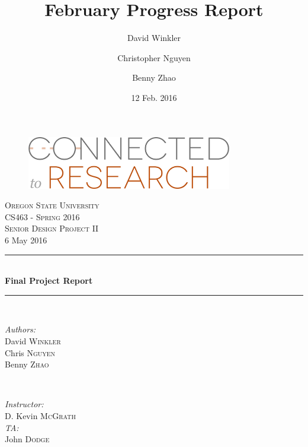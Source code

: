 \documentclass[onecolumn]{IEEEtran}
\title{February Progress Report}
\author{David Winkler \and Christopher Nguyen \and Benny Zhao}
\date{12 Feb. 2016}
\begin{document}
\begin{titlepage}
	\newcommand{\HRule}{\rule{\linewidth}{0.5mm}} %
	\center %
    
    \begin{figure}
        \centering
        \includegraphics[width=0.8\textwidth]{ctr_logo.png}
    \end{figure}
 
	\textsc{\LARGE Oregon State University}\\[1.5cm] %
	\textsc{\Large CS463 - Spring 2016}\\[0.5cm] %
	\textsc{\large Senior Design Project II}\\[0.5cm] %

	{\large 6 May 2016}\\[1cm]
    
	\HRule \\[0.4cm]
		{ \huge \bfseries Final Project Report}\\[0.4cm] %
	\HRule \\[1.5cm]

	\begin{minipage}{0.4\textwidth}
		\begin{flushleft} \large
			\emph{Authors:}\\
			David \textsc{Winkler}\\ %
			Chris \textsc{Nguyen}\\
			Benny \textsc{Zhao}
		\end{flushleft}
	\end{minipage}
	~
	\begin{minipage}{0.4\textwidth}
		\begin{flushright} \large
			\emph{Instructor:} \\
			D. Kevin \textsc{McGrath} \\
            \emph{TA:} \\
            John \textsc{Dodge}
		\end{flushright}
	\end{minipage}\\[2cm]
    

\end{titlepage}
\end{document}
